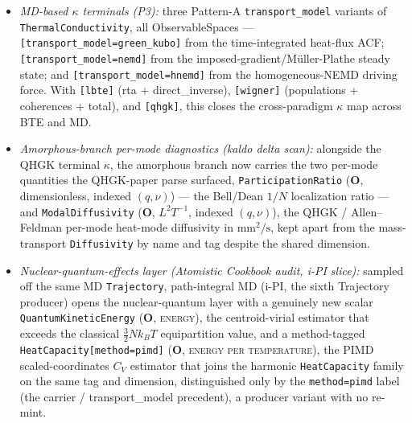 \documentclass[11pt,a4paper]{article}
\begin{document}
\begin{itemize}[leftmargin=2em, itemsep=0.2em]
        the diffusion-limit observable.
  \item \emph{MD-based $\kappa$ terminals (P3):} three Pattern-A
        \texttt{transport\_model} variants of \texttt{ThermalConductivity}, all
        ObservableSpaces --- \texttt{[transport\_model=green\_kubo]} from the
        time-integrated heat-flux ACF; \texttt{[transport\_model=nemd]} from
        the imposed-gradient/Müller-Plathe steady state; and
        \texttt{[transport\_model=hnemd]} from the homogeneous-NEMD driving
        force. With \texttt{[lbte]} (rta + direct\_inverse), \texttt{[wigner]}
        (populations + coherences + total), and \texttt{[qhgk]}, this closes
        the cross-paradigm $\kappa$ map across BTE and MD.
  \item \emph{Amorphous-branch per-mode diagnostics (kaldo delta scan):}
        alongside the QHGK terminal $\kappa$, the amorphous branch now carries
        the two per-mode quantities the QHGK-paper parse surfaced,
        \texttt{ParticipationRatio} (\textbf{O}, dimensionless, indexed
        $(q,\nu)$) --- the Bell/Dean $1/N$ localization ratio --- and
        \texttt{ModalDiffusivity} (\textbf{O}, $L^2 T^{-1}$, indexed
        $(q,\nu)$), the QHGK / Allen--Feldman per-mode heat-mode diffusivity in
        $\text{mm}^2/\text{s}$, kept apart from the mass-transport
        \texttt{Diffusivity} by name and tag despite the shared dimension.
  \item \emph{Nuclear-quantum-effects layer (Atomistic Cookbook audit, i-PI
        slice):} sampled off the same MD \texttt{Trajectory}, path-integral MD
        (i-PI, the sixth Trajectory producer) opens the nuclear-quantum layer
        with a genuinely new scalar \texttt{QuantumKineticEnergy} (\textbf{O},
        \textsc{energy}), the centroid-virial estimator that exceeds the
        classical $\tfrac{3}{2}Nk_BT$ equipartition value, and a method-tagged
        \texttt{HeatCapacity[method=pimd]} (\textbf{O},
        \textsc{energy per temperature}), the PIMD scaled-coordinates $C_V$
        estimator that joins the harmonic \texttt{HeatCapacity} family on the
        same tag and dimension, distinguished only by the \texttt{method=pimd}
        label (the carrier / transport\_model precedent), a producer variant
        with no re-mint.
\end{itemize}
\end{document}
